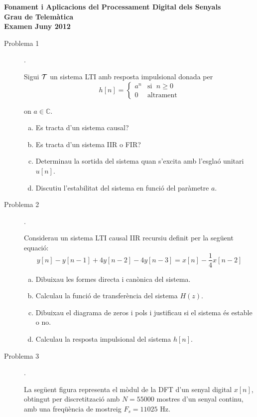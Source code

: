 \documentclass{article}[12pt]
\newcommand\C{\mathbb{C}}
\begin{document}
\begin{center}
\textbf{\Large Fonament i Aplicacions del Processament Digital dels Senyals \\ Grau de Telemàtica \\ Examen Juny 2012}
\end{center}

\begin{description}

\item[Problema 1]. 

Sigui ${\cal T}$ un sistema LTI amb resposta impulsional donada per
\[
h[n]=\begin{cases} a^n & \text{si } \; n \geq 0 \\ 0 & \text{altrament} \end{cases}
\]

\noindent
on $a \in \C$.

\begin{enumerate}[a)]
\item Es tracta d'un sistema causal?
\item Es tracta d'un sistema IIR o FIR?
\item Determinau la sortida del sistema quan s'excita amb l'esglaó unitari $u[n]$.
\item Discutiu l'estabilitat del sistema en funció del paràmetre $a$.
\end{enumerate}


\vskip 0.5cm


\item[Problema 2].

Considerau un sistema LTI causal IIR recursiu definit per la següent equació:
\[
y[n]-y[n-1]+4y[n-2]-4y[n-3]=x[n]-\frac{1}{4}x[n-2]
\]

\begin{enumerate}[a)]
\item Dibuixau les formes directa i canònica del sistema.
\item Calculau la funció de transferència del sistema $H(z)$.
\item Dibuixau el diagrama de zeros i pols i justificau si el sistema és estable o no.
\item Calculau la resposta impulsional del sistema $h[n]$.
\end{enumerate}  


\vskip 0.5cm


\item[Problema 3].

La següent figura representa el mòdul de la DFT d'un senyal digital $x[n]$,
obtingut per discretització amb $N=55000$ mostres d'un senyal continu,
amb una freqüència de mostreig $F_s=11025$ Hz.


\end{description}
\end{document}
